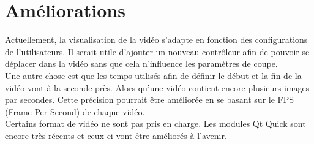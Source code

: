\documentclass[11pt, a4paper, french]{article}
\begin{document}
	\part*{Améliorations}
		Actuellement, la visualisation de la vidéo s'adapte en fonction des configurations de l'utilisateurs. Il serait utile d'ajouter un nouveau contrôleur afin de pouvoir se déplacer dans la vidéo sans que cela n'influence les paramètres de coupe. \\
		
		Une autre chose est que les temps utilisés afin de définir le début et la fin de la vidéo vont à la seconde près. Alors qu'une vidéo contient encore plusieurs images par secondes. Cette précision pourrait être améliorée en se basant sur le FPS (Frame Per Second) de chaque vidéo. \\
		
		Certains format de vidéo ne sont pas pris en charge. Les modules Qt Quick sont encore très récents et ceux-ci vont être améliorés à l'avenir.
	
\end{document}
